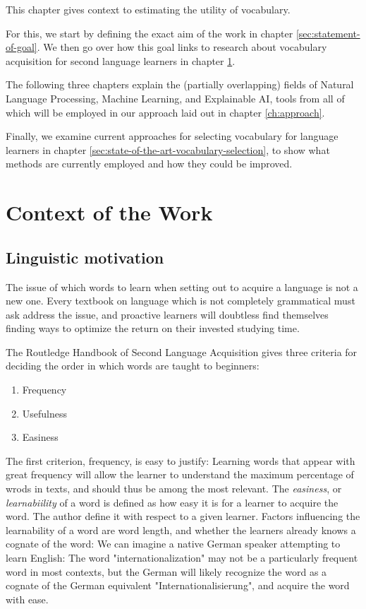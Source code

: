 This chapter gives context to estimating the utility of vocabulary.

For this, we start by defining the exact aim of the work  in chapter \ref{sec:statement-of-goal}.
We then go over how this goal links to research about vocabulary acquisition for second language learners in chapter \ref{sec:context-of-work}.

The following three chapters explain the (partially overlapping) fields of Natural Language Processing, Machine Learning, and Explainable AI, tools from all of which will be employed in our approach laid out in chapter \ref{ch:approach}.

Finally, we examine current approaches for selecting vocabulary for language learners in chapter \ref{sec:state-of-the-art-vocabulary-selection}, to show what methods are currently employed and how they could be improved.


\section{Context of the Work} \label{sec:context-of-work}

\subsection{Linguistic motivation}
The issue of which words to learn when setting out to acquire a language is not a new one.
Every textbook on language which is not completely grammatical must ask address the issue, and proactive learners will doubtless find themselves finding ways to optimize the return on their invested studying time.

The Routledge Handbook of Second Language Acquisition  gives three criteria for deciding the order in which words are taught to beginners:
\begin{enumerate}
	\item Frequency
	\item Usefulness
	\item Easiness
\end{enumerate}
The first criterion, frequency, is easy to justify:
Learning words that appear with great frequency will allow the learner to understand the maximum percentage of wrods in texts, and should thus be among the most relevant.
The \textit{easiness}, or \textit{learnabiility} of a word is defined as how easy it is for a learner to acquire the word.
The author define it with respect to a given learner.
Factors influencing the learnability of a word are word length, and whether the learners already knows a cognate of the word:
We can imagine a native German speaker attempting to learn English:
The word "internationalization" may not be a particularly frequent word in most contexts, but the German will likely recognize the word as a cognate of the German equivalent "Internationalisierung", and acquire the word with ease.

